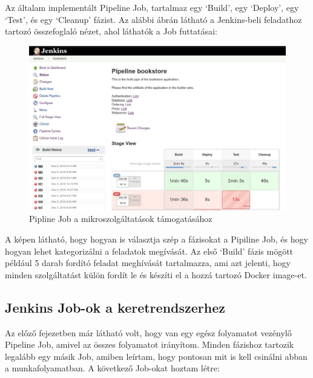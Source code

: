 \documentclass[11pt,magyar,a4paper,twoside,]{report}
\let\Oldincludegraphics\includegraphics
\renewcommand{\includegraphics}[1]{
\begin{adjustbox}{max size={\textwidth}{\textheight}}
    \Oldincludegraphics[scale=0.6]{#1}%
\end{adjustbox}
}
\begin{document}
Az általam implementált Pipeline Job, tartalmaz egy `Build', egy
`Deploy', egy `Test', és egy `Cleanup' fázist. Az alábbi ábrán látható a
Jenkins-beli feladathoz tartozó összefoglaló nézet, ahol láthatók a Job
futtatásai:

\begin{figure}[H]
\centering
\includegraphics{img/pipeline-job.png}
\caption{Pipline Job a mikroszolgáltatások támogatásához}
\end{figure}

A képen látható, hogy hogyan is választja szép a fázisokat a Pipiline
Job, és hogy hogyan lehet kategorizálni a feladatok megívását. Az első
`Build' fázis mögött például 5 darab fordító feladat meghívását
tartalmazza, ami azt jelenti, hogy minden szolgáltatást külön fordít le
és készíti el a hozzá tartozó Docker image-et.

\subsection{Jenkins Job-ok a
keretrendszerhez}\label{jenkins-job-ok-a-keretrendszerhez}

Az előző fejezetben már látható volt, hogy van egy egész folyamatot
vezénylő Pipeline Job, amivel az összes folyamatot irányítom. Minden
fázishoz tartozik legalább egy másik Job, amiben leírtam, hogy pontosan
mit is kell csinálni abban a munkafolyamatban. A következő Job-okat
hoztam létre:
\end{document}
